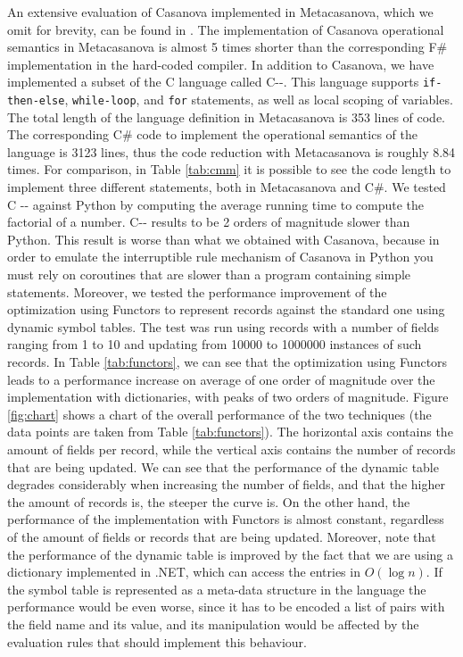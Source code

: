 An extensive evaluation of Casanova implemented in Metacasanova, which we omit for brevity, can be found in \cite{DiGiacomo2017}. The implementation of Casanova operational semantics in Metacasanova is almost 5 times shorter than the corresponding F\# implementation in the hard-coded compiler. In addition to Casanova, we have implemented a subset of the C language called C-{}-. This language supports \texttt{if-then-else}, \texttt{while-loop}, and \texttt{for} statements, as well as local scoping of variables. The total length of the language definition in Metacasanova is 353 lines of code. The corresponding C\# code to implement the operational semantics of the language is 3123 lines, thus the code reduction with Metacasanova is roughly 8.84 times. For comparison, in Table \ref{tab:cmm} it is possible to see the code length to implement three different statements, both in Metacasanova and C\#. We tested C -{}- against Python by computing the average running time to compute the factorial of a number. C-{}- results to be 2 orders of magnitude slower than Python. This result is worse than what we obtained with Casanova, because in order to emulate the interruptible rule mechanism of Casanova in Python you must rely on coroutines that are slower than a program containing simple statements. Moreover, we tested the performance improvement of the optimization using Functors to represent records against the standard one using dynamic symbol tables. The test was run using records with a number of fields ranging from 1 to 10 and updating from 10000 to 1000000 instances of such records. In Table \ref{tab:functors}, we can see that the optimization using Functors leads to a performance increase on average of one order of magnitude over the implementation with dictionaries, with peaks of two orders of magnitude. Figure \ref{fig:chart} shows a chart of the overall performance of the two techniques (the data points are taken from Table \ref{tab:functors}). The horizontal axis contains the amount of fields per record, while the vertical axis contains the number of records that are being updated. We can see that the performance of the dynamic table degrades considerably when increasing the number of fields, and that the higher the amount of records is, the steeper the curve is. On the other hand, the performance of the implementation with Functors is almost constant, regardless of the amount of fields or records that are being updated. Moreover, note that the performance of the dynamic table is improved by the fact that we are using a dictionary implemented in .NET, which can access the entries in $O(\log n)$. If the symbol table is represented as a meta-data structure in the language the performance would be even worse, since it has to be encoded a list of pairs with the field name and its value, and its manipulation would be affected by the evaluation rules that should implement this behaviour.

